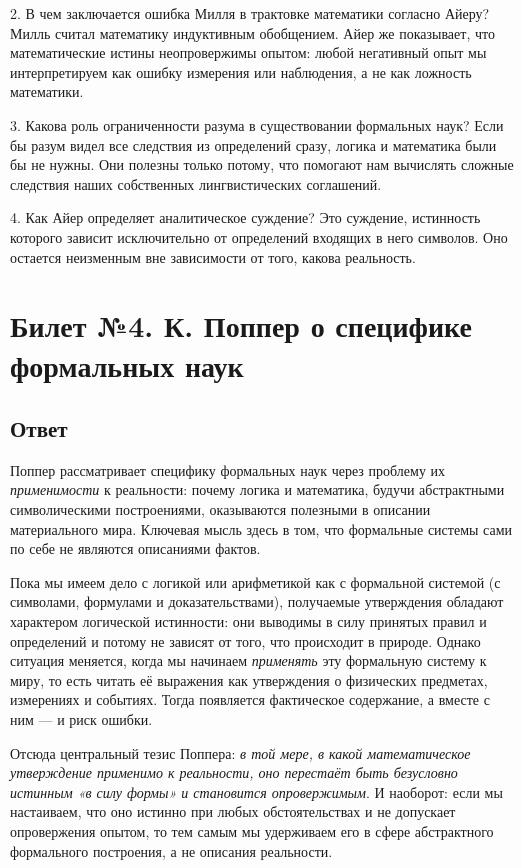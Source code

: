 \documentclass[a4paper,12pt]{article}
\begin{document}
2. В чем заключается ошибка Милля в трактовке математики согласно Айеру?
Милль считал математику индуктивным обобщением. Айер же показывает, что математические истины неопровержимы опытом: любой негативный опыт мы интерпретируем как ошибку измерения или наблюдения, а не как ложность математики.

3. Какова роль ограниченности разума в существовании формальных наук?
Если бы разум видел все следствия из определений сразу, логика и математика были бы не нужны. Они полезны только потому, что помогают нам вычислять сложные следствия наших собственных лингвистических соглашений.

4. Как Айер определяет аналитическое суждение?
Это суждение, истинность которого зависит исключительно от определений входящих в него символов. Оно остается неизменным вне зависимости от того, какова реальность.


\newpage
\section{Билет №4. К. Поппер о специфике формальных наук}

\subsection{Ответ}

Поппер рассматривает специфику формальных наук через проблему их \textit{применимости} к реальности: почему логика и математика, будучи абстрактными символическими построениями, оказываются полезными в описании материального мира. Ключевая мысль здесь в том, что формальные системы сами по себе не являются описаниями фактов.

Пока мы имеем дело с логикой или арифметикой как с формальной системой (с символами, формулами и доказательствами), получаемые утверждения обладают характером логической истинности: они выводимы в силу принятых правил и определений и потому не зависят от того, что происходит в природе. Однако ситуация меняется, когда мы начинаем \textit{применять} эту формальную систему к миру, то есть читать её выражения как утверждения о физических предметах, измерениях и событиях. Тогда появляется фактическое содержание, а вместе с ним — и риск ошибки.

Отсюда центральный тезис Поппера: \textit{в той мере, в какой математическое утверждение применимо к реальности, оно перестаёт быть безусловно истинным «в силу формы» и становится опровержимым}. И наоборот: если мы настаиваем, что оно истинно при любых обстоятельствах и не допускает опровержения опытом, то тем самым мы удерживаем его в сфере абстрактного формального построения, а не описания реальности.
\end{document}
